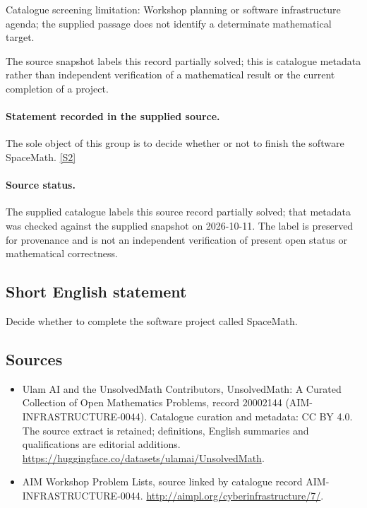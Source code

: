 \documentclass[11pt]{article}
\begin{document}
Catalogue screening limitation: Workshop planning or software infrastructure agenda; the supplied passage does not identify a determinate mathematical target.

The source snapshot labels this record partially solved; this is catalogue metadata rather than independent verification of a mathematical result or the current completion of a project.
\paragraph{Statement recorded in the supplied source.}
The sole object of this group is to decide whether or not to finish the software SpaceMath. \href{http://aimpl.org/cyberinfrastructure/7/}{[S2]}
\paragraph{Source status.}
The supplied catalogue labels this source record partially solved; that metadata was checked against the supplied snapshot on 2026-10-11. The label is preserved for provenance and is not an independent verification of present open status or mathematical correctness.
\subsection{Short English statement}
Decide whether to complete the software project called SpaceMath.
\subsection{Sources}
\begin{itemize}
\item[S1] Ulam AI and the UnsolvedMath Contributors, UnsolvedMath: A Curated Collection of Open Mathematics Problems, record 20002144 (AIM-INFRASTRUCTURE-0044). Catalogue curation and metadata: CC BY 4.0. The source extract is retained; definitions, English summaries and qualifications are editorial additions.
\url{https://huggingface.co/datasets/ulamai/UnsolvedMath}.
\item[S2] AIM Workshop Problem Lists, source linked by catalogue record AIM-INFRASTRUCTURE-0044.
\url{http://aimpl.org/cyberinfrastructure/7/}.
\end{itemize}
\end{document}
